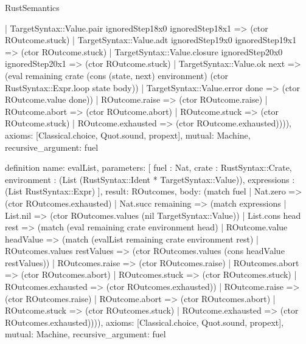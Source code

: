 \begin{lexlean}{RustSemantics}
\begin{semanticmodule}
{          | TargetSyntax::Value.pair ignoredStep18x0 ignoredStep18x1 => (ctor ROutcome.stuck)
          | TargetSyntax::Value.adt ignoredStep19x0 ignoredStep19x1 => (ctor ROutcome.stuck)
          | TargetSyntax::Value.closure ignoredStep20x0 ignoredStep20x1 => (ctor ROutcome.stuck)
          | TargetSyntax::Value.ok next => (eval remaining crate (cons (state, next) environment) (ctor RustSyntax::Expr.loop state body))
          | TargetSyntax::Value.error done => (ctor ROutcome.value done))
        | ROutcome.raise => (ctor ROutcome.raise)
        | ROutcome.abort => (ctor ROutcome.abort)
        | ROutcome.stuck => (ctor ROutcome.stuck)
        | ROutcome.exhausted => (ctor ROutcome.exhausted)))),
  axioms: [Classical.choice, Quot.sound, propext],
  mutual: Machine,
  recursive_argument: fuel
}

definition{
  name: evalList,
  parameters: [
    fuel : Nat,
    crate : RustSyntax::Crate,
    environment : (List (RustSyntax::Ident * TargetSyntax::Value)),
    expressions : (List RustSyntax::Expr)
  ],
  result: ROutcomes,
  body: (match fuel
    | Nat.zero => (ctor ROutcomes.exhausted)
    | Nat.succ remaining => (match expressions
      | List.nil => (ctor ROutcomes.values (nil TargetSyntax::Value))
      | List.cons head rest => (match (eval remaining crate environment head)
        | ROutcome.value headValue => (match (evalList remaining crate environment rest)
          | ROutcomes.values restValues => (ctor ROutcomes.values (cons headValue restValues))
          | ROutcomes.raise => (ctor ROutcomes.raise)
          | ROutcomes.abort => (ctor ROutcomes.abort)
          | ROutcomes.stuck => (ctor ROutcomes.stuck)
          | ROutcomes.exhausted => (ctor ROutcomes.exhausted))
        | ROutcome.raise => (ctor ROutcomes.raise)
        | ROutcome.abort => (ctor ROutcomes.abort)
        | ROutcome.stuck => (ctor ROutcomes.stuck)
        | ROutcome.exhausted => (ctor ROutcomes.exhausted)))),
  axioms: [Classical.choice, Quot.sound, propext],
  mutual: Machine,
  recursive_argument: fuel
}


\end{semanticmodule}
\end{lexlean}
